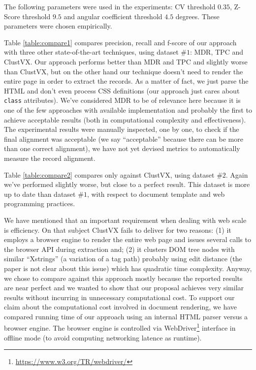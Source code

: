 \documentclass{vldb}
\begin{document}
The following parameters were used in the experiments: CV threshold $0.35$,
Z-Score threshold $9.5$ and angular coefficient threshold $4.5$ degrees. These
parameters were chosen empirically.

Table \ref{table:compare1} compares precision, recall and f-score of our
approach with three other state-of-the-art techniques, using dataset $\#1$:
MDR\cite{MDR03}, TPC\cite{TPC09} and ClustVX\cite{grigalis2013towards}.
Our approach performs better than MDR and TPC and slightly worse than ClustVX,
but on the other hand our technique doesn't need to render the entire page in
order to extract the records. As a matter of fact, we just parse the HTML and
don't even process CSS definitions (our approach just cares about \texttt{class}
attributes).
We've considered MDR to be of relevance here because it is one of the few
approaches with available implementation and probably the first to achieve
acceptable results (both in computational complexity and effectiveness).
The experimental results were manually inspected, one by one, to check if the
final alignment was acceptable (we say ``acceptable'' because there can be more
than one correct alignment), we have not yet devised metrics to automatically
measure the record alignment.

Table \ref{table:compare2} compares only against ClustVX, using dataset $\#2$.
Again we've performed slightly worse, but close to a perfect result. This
dataset is more up to date than dataset $\#1$, with respect to document
template and web programming practices.

We have mentioned that an important requirement when dealing with web scale is
efficiency. On that subject ClustVX fails to deliver for two reasons: (1) it
employs a browser engine to render the entire web page and issues several calls
to the browser API during extraction and; (2) it clusters DOM tree nodes with
similar ``Xstrings'' (a variation of a tag path) probably using edit distance
(the paper is not clear about this issue) which has quadratic time complexity.
Anyway, we chose to compare against this approach mostly because the reported
results are near perfect and we wanted to show that our proposal achieves very
similar results without incurring in unnecessary computational cost. To support
our claim about the computational cost involved in document rendering, we have
compared running time of our approach using an internal HTML parser versus a
browser engine. The browser engine is controlled via
WebDriver\footnote{\url{https://www.w3.org/TR/webdriver/}} interface in offline
mode (to avoid computing networking latence as runtime).
\end{document}
